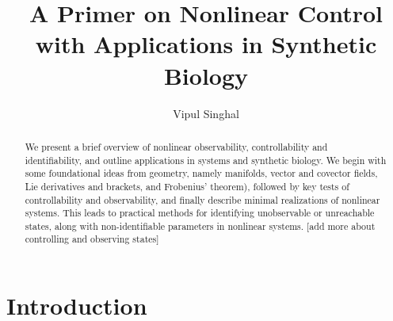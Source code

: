\theoremstyle{definition}
\newtheorem{defn}[thm]{Definition}
\newtheorem{example}[thm]{Example}
\newtheorem{remark}[thm]{Remark}

\newcommand{\R}{\mathds{R}}
\newcommand{\fracpartial}[2]{\frac{\partial #1}{\partial #2}}
\newcommand{\isdefined}{\triangleq}
\newcommand{\liebrack}[2]{[#1,#2]}  %
\DeclareMathOperator{\ann}{ann}      %



\title{A Primer on Nonlinear Control\\
with Applications in Synthetic Biology}
\author{Vipul Singhal}
\address{Integrated Biosciences, 900 Island Drive, Redwood City, CA 94065}

\begin{abstract}
We present a brief overview of nonlinear observability, controllability and identifiability, and outline applications in systems and synthetic biology. We begin with some foundational ideas from geometry, namely manifolds, vector and covector fields, Lie derivatives and brackets, and Frobenius' theorem), followed by key tests of controllability and observability, and finally describe minimal realizations of nonlinear systems. This leads to practical methods for identifying unobservable or unreachable states, along with non-identifiable parameters in nonlinear systems. [add more about controlling and observing states]
\end{abstract}

\maketitle

\section{Introduction}


